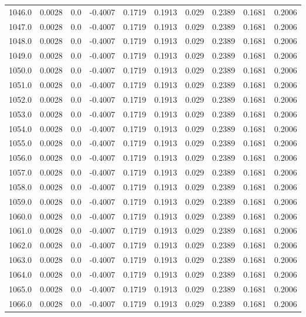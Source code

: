 \begin{longtable}{lrrrrrrrrr}
1046.0 & 0.0028 & 0.0 & -0.4007 & 0.1719 & 0.1913 & 0.029 & 0.2389 & 0.1681 & 0.2006 \\
1047.0 & 0.0028 & 0.0 & -0.4007 & 0.1719 & 0.1913 & 0.029 & 0.2389 & 0.1681 & 0.2006 \\
1048.0 & 0.0028 & 0.0 & -0.4007 & 0.1719 & 0.1913 & 0.029 & 0.2389 & 0.1681 & 0.2006 \\
1049.0 & 0.0028 & 0.0 & -0.4007 & 0.1719 & 0.1913 & 0.029 & 0.2389 & 0.1681 & 0.2006 \\
1050.0 & 0.0028 & 0.0 & -0.4007 & 0.1719 & 0.1913 & 0.029 & 0.2389 & 0.1681 & 0.2006 \\
1051.0 & 0.0028 & 0.0 & -0.4007 & 0.1719 & 0.1913 & 0.029 & 0.2389 & 0.1681 & 0.2006 \\
1052.0 & 0.0028 & 0.0 & -0.4007 & 0.1719 & 0.1913 & 0.029 & 0.2389 & 0.1681 & 0.2006 \\
1053.0 & 0.0028 & 0.0 & -0.4007 & 0.1719 & 0.1913 & 0.029 & 0.2389 & 0.1681 & 0.2006 \\
1054.0 & 0.0028 & 0.0 & -0.4007 & 0.1719 & 0.1913 & 0.029 & 0.2389 & 0.1681 & 0.2006 \\
1055.0 & 0.0028 & 0.0 & -0.4007 & 0.1719 & 0.1913 & 0.029 & 0.2389 & 0.1681 & 0.2006 \\
1056.0 & 0.0028 & 0.0 & -0.4007 & 0.1719 & 0.1913 & 0.029 & 0.2389 & 0.1681 & 0.2006 \\
1057.0 & 0.0028 & 0.0 & -0.4007 & 0.1719 & 0.1913 & 0.029 & 0.2389 & 0.1681 & 0.2006 \\
1058.0 & 0.0028 & 0.0 & -0.4007 & 0.1719 & 0.1913 & 0.029 & 0.2389 & 0.1681 & 0.2006 \\
1059.0 & 0.0028 & 0.0 & -0.4007 & 0.1719 & 0.1913 & 0.029 & 0.2389 & 0.1681 & 0.2006 \\
1060.0 & 0.0028 & 0.0 & -0.4007 & 0.1719 & 0.1913 & 0.029 & 0.2389 & 0.1681 & 0.2006 \\
1061.0 & 0.0028 & 0.0 & -0.4007 & 0.1719 & 0.1913 & 0.029 & 0.2389 & 0.1681 & 0.2006 \\
1062.0 & 0.0028 & 0.0 & -0.4007 & 0.1719 & 0.1913 & 0.029 & 0.2389 & 0.1681 & 0.2006 \\
1063.0 & 0.0028 & 0.0 & -0.4007 & 0.1719 & 0.1913 & 0.029 & 0.2389 & 0.1681 & 0.2006 \\
1064.0 & 0.0028 & 0.0 & -0.4007 & 0.1719 & 0.1913 & 0.029 & 0.2389 & 0.1681 & 0.2006 \\
1065.0 & 0.0028 & 0.0 & -0.4007 & 0.1719 & 0.1913 & 0.029 & 0.2389 & 0.1681 & 0.2006 \\
1066.0 & 0.0028 & 0.0 & -0.4007 & 0.1719 & 0.1913 & 0.029 & 0.2389 & 0.1681 & 0.2006 \\

\end{longtable}
